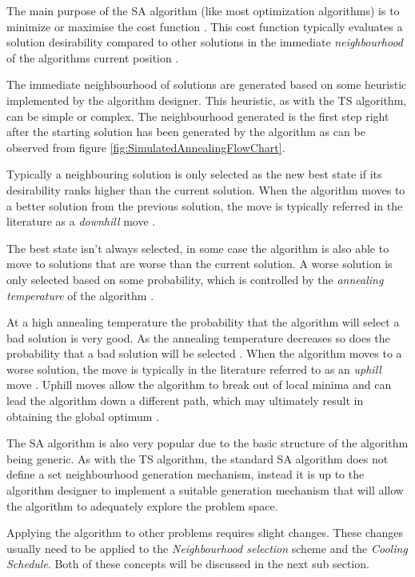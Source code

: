 The main purpose of the SA algorithm (like most optimization algorithms) is to minimize or maximise the cost function \cite{SASingleMultiObj}. This cost function typically evaluates a solution desirability compared to other solutions in the immediate \emph{neighbourhood} of the algorithms current position \cite{TheoPraticalSA}. 

The immediate neighbourhood of solutions are generated based on some heuristic implemented by the algorithm designer\cite{AIModernApproach}. This heuristic, as with the TS algorithm, can be simple or complex. The neighbourhood generated is the first step right after the starting solution has been generated by the algorithm as can be observed from figure \ref{fig:SimulatedAnnealingFlowChart}.

Typically a neighbouring solution is only selected as the new best state if its desirability ranks higher than the current solution. When the algorithm moves to a better solution from the previous solution, the move is typically referred in the literature as a \emph{downhill} move \cite{CurveFittingSA}.

The best state isn't always selected, in some case the algorithm is also able to move to solutions that are worse than the current solution. A worse solution is only selected based on some probability, which is controlled by the \emph{annealing temperature} of the algorithm \cite{TheoPraticalSA}. 

At a high annealing temperature the probability that the algorithm will select a bad solution is very good. As the annealing temperature decreases so does the probability that a bad solution will be selected \cite{CurveFittingSA}. When the algorithm moves to a worse solution, the move is typically in the literature referred to as an \emph{uphill} move \cite{CurveFittingSA}. Uphill moves allow the algorithm to break out of local minima and can lead the algorithm down a different path, which may ultimately result in obtaining the global optimum \cite{SASingleMultiObj}. 

The SA algorithm is also very popular due to the basic structure of the algorithm being generic\cite{VariousCoolingSA}. As with the TS algorithm, the standard SA algorithm does not define a set neighbourhood generation mechanism, instead it is up to the algorithm designer to implement a suitable generation mechanism that will allow the algorithm to adequately explore the problem space\cite{VariousCoolingSA}. 

Applying the algorithm to other problems requires slight changes. These changes usually need to be applied to the \emph{Neighbourhood selection} scheme and the \emph{Cooling Schedule}\cite{VariousCoolingSA,DormRoomSA}. Both of these concepts will be discussed in the next sub section.


